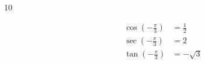 \documentclass{exam}
\begin{document}
\begin{description}
      \item[10]
        \begin{align*}
          \cos \left( - \frac{\pi}{3} \right) & = \boxed{ \frac{1}{2} } \\
          \sec \left( - \frac{\pi}{3} \right) & = \boxed{ 2 } \\
          \tan \left( - \frac{\pi}{3} \right) & = \boxed{ - \sqrt{3} } \\
        \end{align*}






\end{description}
\end{document}
